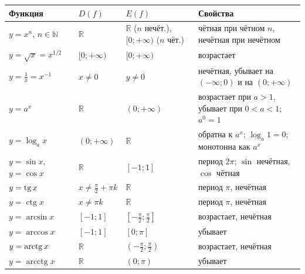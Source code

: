 \documentclass[a4paper,11pt]{article}
\newcommand{\N}{\mathbb{N}}
\newcommand{\R}{\mathbb{R}}
\begin{document}
\begin{center}
\renewcommand{\arraystretch}{1.35}
\small
\begin{tabular}{|l|l|>{\raggedright\arraybackslash}p{3.3cm}|>{\raggedright\arraybackslash}p{6.2cm}|}
\hline
\textbf{Функция} & $D(f)$ & $E(f)$ & \textbf{Свойства} \\ \hline
$y = x^n$, $n \in \N$ & $\R$ & $\R$ ($n$ нечёт.), $[0; +\infty)$ ($n$ чёт.) & чётная при чётном $n$, нечётная при нечётном \\
$y = \sqrt{x} = x^{1/2}$ & $[0; +\infty)$ & $[0; +\infty)$ & возрастает \\
$y = \frac1x = x^{-1}$ & $x \ne 0$ & $y \ne 0$ & нечётная, убывает на $(-\infty; 0)$ и на $(0; +\infty)$ \\ \hline
$y = a^x$ & $\R$ & $(0; +\infty)$ & возрастает при $a > 1$, убывает при $0 < a < 1$; $a^0 = 1$ \\
$y = \log_a x$ & $(0; +\infty)$ & $\R$ & обратна к $a^x$; $\log_a 1 = 0$; монотонна как $a^x$ \\ \hline
$y = \sin x$, $y = \cos x$ & $\R$ & $[-1; 1]$ & период $2\pi$; $\sin$ нечётная, $\cos$ чётная \\
$y = \operatorname{tg} x$ & $x \ne \frac\pi2 + \pi k$ & $\R$ & период $\pi$, нечётная \\
$y = \operatorname{ctg} x$ & $x \ne \pi k$ & $\R$ & период $\pi$, нечётная \\ \hline
$y = \arcsin x$ & $[-1; 1]$ & $\left[-\frac\pi2; \frac\pi2\right]$ & возрастает, нечётная \\
$y = \arccos x$ & $[-1; 1]$ & $[0; \pi]$ & убывает \\
$y = \operatorname{arctg} x$ & $\R$ & $\left(-\frac\pi2; \frac\pi2\right)$ & возрастает, нечётная \\
$y = \operatorname{arcctg} x$ & $\R$ & $(0; \pi)$ & убывает \\ \hline
\end{tabular}
\end{center}
\end{document}
